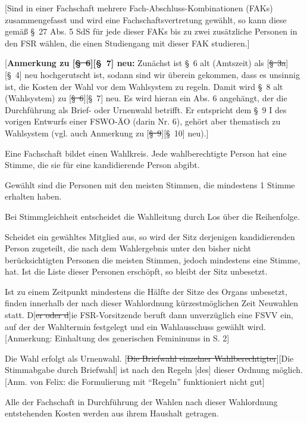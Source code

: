 \documentclass[%
draft,%
multilinesections%
]{fswo}
\newcommand\oldT[1]  {{\color{Gray}[\st{#1}]}}
\newcommand\newT[1]  {{\color{Green}[#1]}}
\newcommand\bemFr[1] {{\color{Red}[#1]}}
\newcommand\bemFe[1] {{\color{Cyan}[#1]}}
\newcommand\oldT[1]{}%
\newcommand\newT[1]{#1}
\newcommand\bemFr[1]{}%
\newcommand\bemFe[1]{}%
\newcommand\change[2]{\oldT{#1}\newT{#2}}
\begin{document}
\begin{contract}
\newT{Sind in einer Fachschaft mehrere Fach-Abschluss-Kombinationen (FAKs) zusammengefasst und wird eine Fachschaftsvertretung gewählt, so kann diese gemäß \S~27 Abs. 5 SdS für jede dieser FAKs bis zu zwei zusätzliche Personen in den FSR wählen, die einen Studiengang mit dieser FAK studieren.\label{cls-wahl-fsr:abs-fak}}
\end{contract}

\bemFr{\textbf{Anmerkung zu \change{\S~6}{\S~7} neu:} Zunächst ist \S~6 alt (Amtszeit) als \change{\S~3a}{\S~4} neu hochgerutscht ist, sodann sind wir überein gekommen, dass es unsinnig ist, die Kosten der Wahl vor dem Wahlsystem zu regeln. Damit wird \S~8 alt (Wahlsystem) zu \change{\S~6}{\S~7} neu. Es wird hieran ein Abs. 6 angehängt, der die Durchführung als Brief- oder Urnenwahl betrifft. Er entspricht dem \S~9 I des vorigen Entwurfs einer FSWO-ÄO (darin Nr. 6), gehört aber thematisch zu Wahlsystem (vgl. auch Anmerkung zu \change{\S~9}{\S~10} neu).}

\begin{contract}
\label{cls-wahlsystem}
Eine Fachschaft bildet einen Wahlkreis.
Jede wahlberechtigte Person hat eine Stimme, die sie für eine kandidierende Person abgibt.

Gewählt sind die Personen mit den meisten Stimmen, die mindestens 1 Stimme erhalten haben.

Bei Stimmgleichheit entscheidet die Wahlleitung durch Los über die Reihenfolge.

Scheidet ein gewähltes Mitglied aus, so wird der Sitz derjenigen kandidierenden Person zugeteilt, die nach dem Wahlergebnis unter den bisher nicht berücksichtigten Personen die meisten Stimmen, jedoch mindestens eine Stimme, hat.
Ist die Liste dieser Personen erschöpft, so bleibt der Sitz unbesetzt.

Ist zu einem Zeitpunkt mindestens die Hälfte der Sitze des Organs unbesetzt, finden innerhalb der nach dieser Wahlordnung kürzestmöglichen Zeit Neuwahlen statt.
D\oldT{er oder d}ie FSR-Vorsitzende beruft dann unverzüglich eine FSVV ein, auf der der Wahltermin festgelegt und ein Wahlausschuss gewählt wird. \bemFr{Anmerkung: Einhaltung des generischen Femininums in S. 2}

Die Wahl erfolgt als Urnenwahl.
\change{Die Briefwahl einzelner Wahlberechtigter}{Die Stimmabgabe durch Briefwahl} ist nach den Regeln \newT{des}  dieser Ordnung möglich. \bemFe{Anm. von Felix: die Formulierung mit \enquote{Regeln} funktioniert nicht gut}


Alle der Fachschaft in Durchführung der Wahlen nach dieser Wahlordnung entstehenden Kosten werden aus ihrem Haushalt getragen.
\end{contract}
\end{document}
